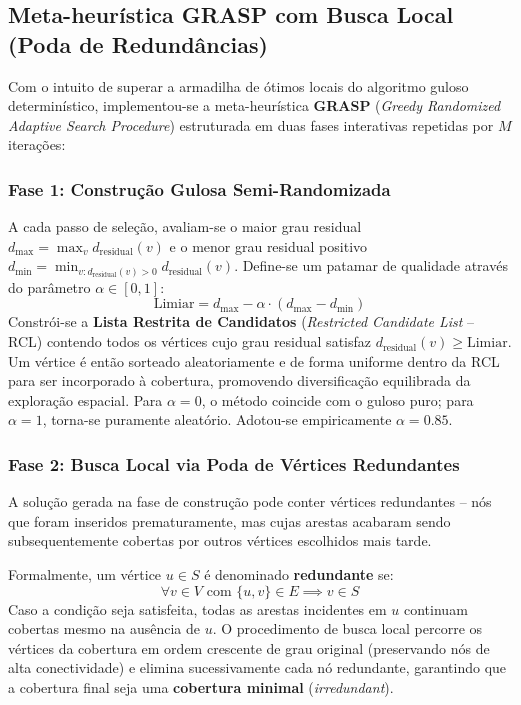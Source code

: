 \documentclass[12pt,a4paper]{article}
\begin{document}
\subsection{Meta-heurística GRASP com Busca Local (Poda de Redundâncias)}
Com o intuito de superar a armadilha de ótimos locais do algoritmo guloso determinístico, implementou-se a meta-heurística \textbf{GRASP} (\textit{Greedy Randomized Adaptive Search Procedure}) estruturada em duas fases interativas repetidas por $M$ iterações:

\subsubsection*{Fase 1: Construção Gulosa Semi-Randomizada}
A cada passo de seleção, avaliam-se o maior grau residual $d_{\max} = \max_{v} d_{\text{residual}}(v)$ e o menor grau residual positivo $d_{\min} = \min_{v: d_{\text{residual}}(v) > 0} d_{\text{residual}}(v)$. Define-se um patamar de qualidade através do parâmetro $\alpha \in [0, 1]$:
\begin{equation}
    \text{Limiar} = d_{\max} - \alpha \cdot (d_{\max} - d_{\min})
\end{equation}
Constrói-se a \textbf{Lista Restrita de Candidatos} (\textit{Restricted Candidate List} -- RCL) contendo todos os vértices cujo grau residual satisfaz $d_{\text{residual}}(v) \ge \text{Limiar}$. Um vértice é então sorteado aleatoriamente e de forma uniforme dentro da RCL para ser incorporado à cobertura, promovendo diversificação equilibrada da exploração espacial. Para $\alpha = 0$, o método coincide com o guloso puro; para $\alpha = 1$, torna-se puramente aleatório. Adotou-se empiricamente $\alpha = 0.85$.

\subsubsection*{Fase 2: Busca Local via Poda de Vértices Redundantes}
A solução gerada na fase de construção pode conter vértices redundantes -- nós que foram inseridos prematuramente, mas cujas arestas acabaram sendo subsequentemente cobertas por outros vértices escolhidos mais tarde. 

Formalmente, um vértice $u \in S$ é denominado \textbf{redundante} se:
\begin{equation}
    \forall v \in V \text{ com } \{u, v\} \in E \implies v \in S
\end{equation}
Caso a condição seja satisfeita, todas as arestas incidentes em $u$ continuam cobertas mesmo na ausência de $u$. O procedimento de busca local percorre os vértices da cobertura em ordem crescente de grau original (preservando nós de alta conectividade) e elimina sucessivamente cada nó redundante, garantindo que a cobertura final seja uma \textbf{cobertura minimal} (\textit{irredundant}).
\end{document}
